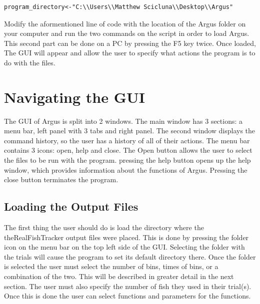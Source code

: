 \documentclass[12pt,titlepage]{report}
\begin{document}
\begin{verbatim}
program_directory<-"C:\\Users\\Matthew Scicluna\\Desktop\\Argus"
\end{verbatim}

Modify the aformentioned line of code with the location of the Argus folder on your computer and run the two commands on the script in order to load Argus. This second part can be done on a PC by pressing the F5 key twice. Once loaded, The GUI will appear and allow the user to specify what actions the program is to do with the files. 

\section{Navigating the GUI}
The GUI of Argus is split into 2 windows. The main window has 3 sections: a menu bar, left panel with 3 tabs and right panel. The second window displays the command history, so the user has a history of all of their actions. The menu bar contains 3 icons: open, help and close. The Open button allows the user to select the files to be run with the program. pressing the help button opens up the help window, which provides information about the functions of Argus. Pressing the close button terminates the program.

\subsection{Loading the Output Files}
The first thing the user should do is load the directory where the theRealFishTracker output files were placed. This is done by pressing the folder icon on the menu bar on the top left side of the GUI. Selecting the folder with the trials will cause the program to set its default directory there. Once the folder is selected the user must select the number of bins, times of bins, or a combination of the two. This will be described in greater detail in the next section. The user must also specify the number of fish they used in their trial(s). Once this is done the user can select functions and parameters for the functions.
\end{document}
